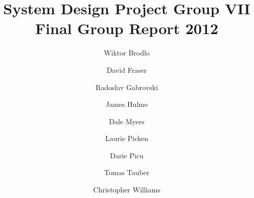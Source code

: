 \documentclass[12pt,a4paper]{article}
\begin{document}
\title{System Design Project Group VII Final Group Report 2012}
\author{Wiktor Brodlo \and David Fraser \and Radoslav Gabrovski \and James
Hulme \and Dale Myers \and Laurie Picken \and Darie Picu \and Tomas Tauber \and
Christopher Williams}

\maketitle

\twocolumn









\onecolumn
\appendix

\clearpage


\clearpage

\clearpage

\clearpage

\clearpage


\clearpage

\newpage


\end{document}
